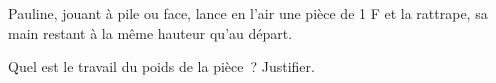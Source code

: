 Pauline, jouant à pile ou face, lance en l'air une pièce de 1 F et la rattrape,
sa main restant à la même hauteur qu'au départ.

Quel est le travail du poids de la pièce~? Justifier.

